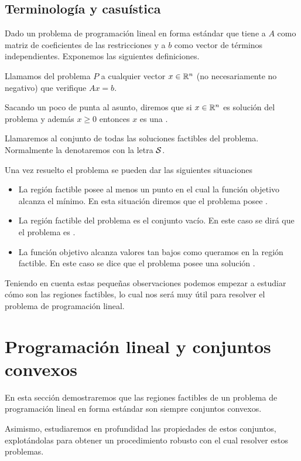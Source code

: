 \subsection{Terminología y casuística}
Dado un problema de programación lineal en forma estándar que tiene a $A$ como matriz de coeficientes de las restricciones y a $b$ como vector de términos independientes. Exponemos las siguientes definiciones.
\begin{defi}[Soluciones]
	Llamamos  del problema $P$ a cualquier vector $x\in\mathbb{R}^n$ (no necesariamente no negativo) que verifique $Ax=b$.
	
	Sacando un poco de punta al asunto, diremos que si $x\in\mathbb{R}^n$ es solución del problema y además $x\geq 0$ entonces $x$ es una .
	
	Llamaremos  al conjunto de todas las soluciones factibles del problema. Normalmente la denotaremos con la letra $\mathcal{S}$.
\end{defi}
Una vez resuelto el problema se pueden dar las siguientes situaciones
\begin{itemize}
	\item La región factible posee al menos un punto en el cual la función objetivo alcanza el mínimo. En esta situación diremos que el problema posee .
	\item La región factible del problema es el conjunto vacío. En este caso se dirá que el problema es .
	\item La función objetivo alcanza valores tan bajos como queramos en la región factible. En este caso se dice que el problema posee una solución .
\end{itemize}
Teniendo en cuenta estas pequeñas observaciones podemos empezar a estudiar cómo son las regiones factibles, lo cual nos será muy útil para resolver el problema de programación lineal.
\section{Programación lineal y conjuntos convexos}
En esta sección demostraremos que las regiones factibles de un problema de programación lineal en forma estándar son siempre conjuntos convexos. 

Asimismo, estudiaremos en profundidad las propiedades de estos conjuntos, explotándolas para obtener un procedimiento robusto con el cual resolver estos problemas.
